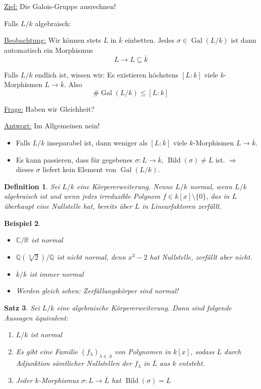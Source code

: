 \documentclass[a4paper,12pt,numbers=noenddot,parskip=full]{scrartcl}
\newcommand{\setQ}{\mathbb{Q}}
\newcommand{\setR}{\mathbb{R}}
\newcommand{\setC}{\mathbb{C}}
\newcommand{\heading}{\underline}
\DeclareMathOperator{\Gal}{Gal}
\theoremstyle{dotless}
\newtheorem{theorem}{Satz}[section]
\newtheorem{definition}[theorem]{Definition}
\newtheorem{example}[theorem]{Beispiel}
\theoremstyle{remark}
\begin{document}
	\heading{Ziel:} Die Galois-Gruppe ausrechnen!
	
	Falls $L/k$ algebraisch:
	
	\heading{Beobachtung:} Wir können stets $L$ in $\overline{k}$ einbetten. Jedes $\sigma \in \Gal(L/k)$ ist dann automatisch ein Morphismus
	\begin{equation*}
		L \to L \subseteq \overline{k}
	\end{equation*}
	
	Falls $L/k$ endlich ist, wissen wir: Es existieren höchstens $[L:k]$ viele $k$-Morphismen $L \to \overline{k}$. Also
	\begin{equation*}
		\#\Gal(L/k) \leq [L:k]
	\end{equation*}
	
	\heading{Frage:} Haben wir Gleichheit?
	
	\heading{Antwort:} Im Allgemeinen nein!
	\begin{itemize}
		\item Falls $L/k$ inseparabel ist, dann weniger als $[L:k]$ viele $k$-Morphismen $L \to \overline{k}$.
		\item Es kann passieren, dass für gegebenes $\sigma: L \to \overline{k}$, $\operatorname{Bild}(\sigma) \neq L$ ist. $\Rightarrow$ dieses $\sigma$ liefert kein Element von $\Gal(L/k)$.
	\end{itemize}

	\begin{definition}
		Sei $L/k$ eine Körpererweiterung. Nenne $L/k$ normal, wenn $L/k$ algebraisch ist und wenn jedes irreduzible Polynom $f \in k[x] \setminus \{ 0 \}$, das in $L$ überhaupt eine Nullstelle hat, bereits über $L$ in Linearfaktoren zerfällt.
	\end{definition}

	\begin{example}
		\begin{itemize}
			\item $\setC/\setR$ ist normal
			\item $\setQ(\sqrt[3]{2})/\setQ$ ist nicht normal, denn $x^3 - 2$ hat Nullstelle, zerfällt aber nicht.
			\item $\overline{k}/k$ ist immer normal
			\item Werden gleich sehen: Zerfällungskörper sind normal!
		\end{itemize}
	\end{example}

	\begin{theorem}
		Sei $L/k$ eine algebraische Körpererweiterung. Dann sind folgende Aussagen äquivalent:
		\begin{enumerate}
			\item $L/k$ ist normal
			\item Es gibt eine Familie $(f_\lambda)_{\lambda \in \Lambda}$ von Polynomen in $k[x]$, sodass $L$ durch Adjunktion sämtlicher Nullstellen der $f_\lambda$ in $\overline{L}$ aus $k$ entsteht.
			\item Jeder $k$-Morphismus $\sigma: L \to \overline{L}$ hat $\operatorname{Bild}(\sigma) = L$
		\end{enumerate}
	\end{theorem}
\end{document}
